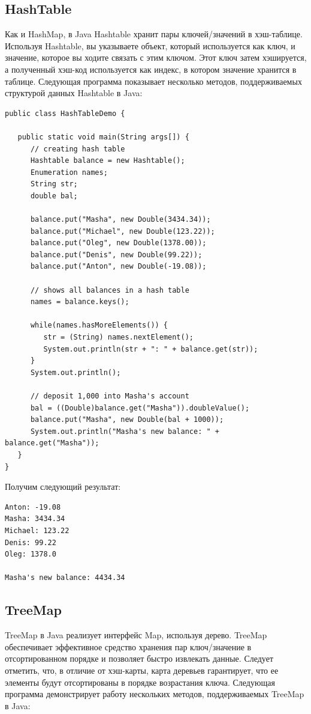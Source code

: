 \subsection{HashTable}

Как и HashMap, в Java Hashtable хранит пары ключей/значений в хэш-таблице. Используя Hashtable, вы указываете объект, который используется как ключ, и значение, которое вы ходите связать с этим ключом. Этот ключ затем хэшируется, а полученный хэш-код используется как индекс, в котором значение хранится в таблице. Следующая программа показывает несколько методов, поддерживаемых структурой данных Hashtable в Java:

\begin{lstlisting}
public class HashTableDemo {

   public static void main(String args[]) {
      // creating hash table
      Hashtable balance = new Hashtable();
      Enumeration names;
      String str;
      double bal;

      balance.put("Masha", new Double(3434.34));
      balance.put("Michael", new Double(123.22));
      balance.put("Oleg", new Double(1378.00));
      balance.put("Denis", new Double(99.22));
      balance.put("Anton", new Double(-19.08));

      // shows all balances in a hash table
      names = balance.keys();
      
      while(names.hasMoreElements()) {
         str = (String) names.nextElement();
         System.out.println(str + ": " + balance.get(str));
      }        
      System.out.println();
      
      // deposit 1,000 into Masha's account
      bal = ((Double)balance.get("Masha")).doubleValue();
      balance.put("Masha", new Double(bal + 1000));
      System.out.println("Masha's new balance: " + balance.get("Masha"));
   }
}
\end{lstlisting}

Получим следующий результат:

\begin{lstlisting}
Anton: -19.08
Masha: 3434.34
Michael: 123.22
Denis: 99.22
Oleg: 1378.0

Masha's new balance: 4434.34
\end{lstlisting}

\subsection{TreeMap}

TreeMap в Java реализует интерфейс Map, используя дерево. TreeMap обеспечивает эффективное средство хранения пар ключ/значение в отсортированном порядке и позволяет быстро извлекать данные. Следует отметить, что, в отличие от хэш-карты, карта деревьев гарантирует, что ее элементы будут отсортированы в порядке возрастания ключа. Следующая программа демонстрирует работу нескольких методов, поддерживаемых TreeMap в Java:

